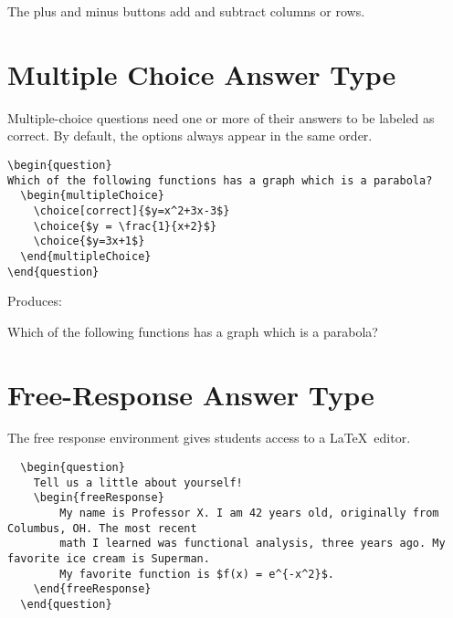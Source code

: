 \documentclass{ximera}
\begin{document}
\begin{remark}
  The plus and minus buttons add and subtract columns or rows.  
\end{remark}


\section{Multiple Choice Answer Type}

Multiple-choice questions need one or more of their answers to be labeled as correct. By default, the options always appear in the same order.

\begin{verbatim}
\begin{question}
Which of the following functions has a graph which is a parabola?
  \begin{multipleChoice}
    \choice[correct]{$y=x^2+3x-3$}
    \choice{$y = \frac{1}{x+2}$}
    \choice{$y=3x+1$}
  \end{multipleChoice}
\end{question}
\end{verbatim}

Produces:

\begin{question}
  Which of the following functions has a graph which is a parabola?
  \begin{multipleChoice}
  \end{multipleChoice}
\end{question}


\section{Free-Response Answer Type}

The free response environment gives students access to a \LaTeX\ editor. 

\begin{verbatim}
  \begin{question}
    Tell us a little about yourself!
    \begin{freeResponse}
        My name is Professor X. I am 42 years old, originally from Columbus, OH. The most recent 
        math I learned was functional analysis, three years ago. My favorite ice cream is Superman. 
        My favorite function is $f(x) = e^{-x^2}$.
    \end{freeResponse}
  \end{question}
\end{verbatim}
\end{document}
